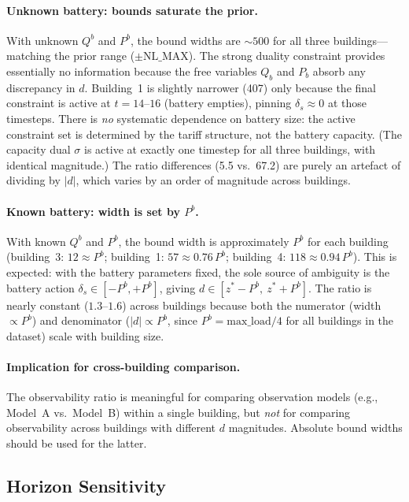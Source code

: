 \documentclass[11pt,a4paper]{article}
\newcommand{\deltas}{\delta_s}
\newcommand{\netload}{d}
\newcommand{\Qb}{{Q^b}}
\newcommand{\Pb}{{P^b}}
\begin{document}
\paragraph{Unknown battery: bounds saturate the prior.}
With unknown $\Qb$ and $\Pb$, the bound widths are $\sim 500$ for all three buildings---matching the prior range ($\pm\text{NL\_MAX}$). The strong duality constraint provides essentially no information because the free variables $Q_b$ and $P_b$ absorb any discrepancy in $\netload$. Building~1 is slightly narrower (407) only because the final constraint is active at $t=14$--$16$ (battery empties), pinning $\deltas \approx 0$ at those timesteps. There is \emph{no} systematic dependence on battery size: the active constraint set is determined by the tariff structure, not the battery capacity. (The capacity dual $\sigma$ is active at exactly one timestep for all three buildings, with identical magnitude.) The ratio differences (5.5 vs.\ 67.2) are purely an artefact of dividing by $|\netload|$, which varies by an order of magnitude across buildings.

\paragraph{Known battery: width is set by $\Pb$.}
With known $\Qb$ and $\Pb$, the bound width is approximately $\Pb$ for each building (building~3: $12 \approx \Pb$; building~1: $57 \approx 0.76\,\Pb$; building~4: $118 \approx 0.94\,\Pb$). This is expected: with the battery parameters fixed, the sole source of ambiguity is the battery action $\deltas \in [-\Pb, +\Pb]$, giving $\netload \in [z^* - \Pb,\ z^* + \Pb]$. The ratio is nearly constant ($1.3$--$1.6$) across buildings because both the numerator (width $\propto \Pb$) and denominator ($|\netload| \propto \Pb$, since $\Pb = \text{max\_load}/4$ for all buildings in the dataset) scale with building size.

\paragraph{Implication for cross-building comparison.}
The observability ratio is meaningful for comparing observation models (e.g., Model~A vs.\ Model~B) within a single building, but \emph{not} for comparing observability across buildings with different $\netload$ magnitudes. Absolute bound widths should be used for the latter.

\subsection{Horizon Sensitivity}
\end{document}

